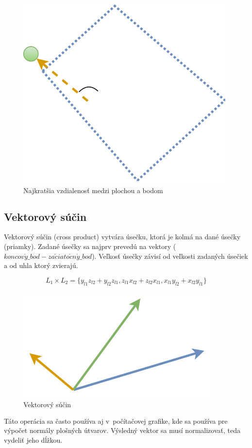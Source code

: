 \begin{figure}[H]
	\centering
	\includegraphics[height=0.3\textwidth]{obrazky-figures/Diagram/Draw/2Line/DP Navrh operacii-1D - LineMinSP.pdf}
	\caption{Najkratšia vzdialenosť medzi plochou a bodom}
	\label{fig:LineMinSP}
\end{figure}


\subsection*{Vektorový súčin}\label{subsec:crossproduct}
Vektorový súčin (cross product) vytvára úsečku, ktorá je kolmá na dané úsečky (priamky). Zadané úsečky sa najprv prevedú na vektory ($koncov\acute{y}\_bod - za\check{c}iato\check{c}n\acute{y}\_bod$).
Veľkosť úsečky závisí od veľkosti zadaných úsečiek a od uhla ktorý zvierajú. 

\begin{equation}
 L_1 \times L_2 =  \{
 y_{l1} z_{l2} + y_{l2} z_{l1} ,
 z_{l1} x_{l2} + z_{l2} x_{l1} ,
 x_{l1} y_{l2} + x_{l2} y_{l1}\}
    \label{eq:cross}
\end{equation}


\begin{figure}[H]
	\centering
	\includegraphics[height=0.3\textwidth]{obrazky-figures/Diagram/Draw/2Line/DP Navrh operacii-1D - LineCross.pdf}
	\caption{Vektorový súčin}
	\label{fig:LineCross}
\end{figure}

Táto operácia sa často používa aj v~počítačovej grafike, kde sa používa pre výpočet normály plošných útvarov. Výsledný vektor sa musí normalizovať, teda vydeliť jeho dĺžkou.



